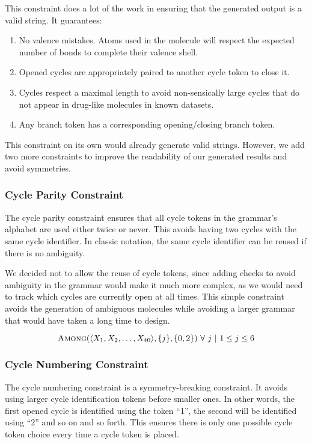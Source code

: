\documentclass[../Document.tex]{subfiles}
\begin{document}
This constraint does a lot of the work in ensuring that the generated output is a valid \smiles string. It guarantees:
\begin{enumerate}
    \item No valence mistakes. Atoms used in the molecule will respect the expected number of bonds to complete their valence shell.
    \item Opened cycles are appropriately paired to another cycle token to close it.
    \item Cycles respect a maximal length to avoid non-sensically large cycles that do not appear in drug-like molecules in known datasets.
    \item Any branch token has a corresponding opening/closing branch token.
\end{enumerate}

This constraint on its own would already generate valid \smiles strings. However, we add two more constraints to improve the readability of our generated results and avoid symmetries.

\subsubsection{Cycle Parity Constraint}
The cycle parity constraint ensures that all cycle tokens in the grammar's alphabet are used either twice or never. This avoids having two cycles with the same cycle identifier. In classic \smiles notation, the same cycle identifier can be reused if there is no ambiguity.

We decided not to allow the reuse of cycle tokens, since adding checks to avoid ambiguity in the grammar would make it much more complex, as we would need to track which cycles are currently open at all times. This simple constraint avoids the generation of ambiguous molecules while avoiding a larger grammar that would have taken a long time to design.

$$
    \mbox{\sc Among}(\langle X_1, X_2, \ldots, X_{40} \rangle, \{j\}, \{0,2\})\ \forall\ j\ \vert\ 1 \leq j \leq 6
$$

\subsubsection{Cycle Numbering Constraint}
\label{sec:cycle-numbering-constraint}
The cycle numbering constraint is a symmetry-breaking constraint. It avoids using larger cycle identification tokens before smaller ones. In other words, the first opened cycle is identified using the token ``1'', the second will be identified using ``2'' and so on and so forth.
This ensures there is only one possible cycle token choice every time a cycle token is placed.
\end{document}
